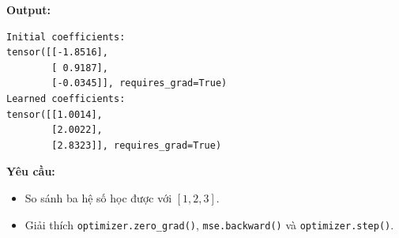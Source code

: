 \documentclass[12pt,a4paper]{article}
\begin{document}
\textbf{Output:}
\begin{verbatim}
Initial coefficients:
tensor([[-1.8516],
        [ 0.9187],
        [-0.0345]], requires_grad=True)
Learned coefficients:
tensor([[1.0014],
        [2.0022],
        [2.8323]], requires_grad=True)
\end{verbatim}

\textbf{Yêu cầu:}
\begin{itemize}
    \item So sánh ba hệ số học được với $[1,2,3]$.
    \item Giải thích \texttt{optimizer.zero\_grad()}, \texttt{mse.backward()} và \texttt{optimizer.step()}.
\end{itemize}
\end{document}
